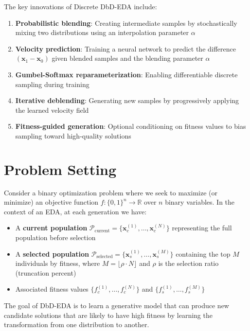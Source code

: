\documentclass[11pt,a4paper]{article}
\newcommand{\R}{\mathbb{R}}
\newcommand{\vx}{\mathbf{x}}
\begin{document}
The key innovations of Discrete DbD-EDA include:
\begin{enumerate}
    \item \textbf{Probabilistic blending}: Creating intermediate samples by stochastically mixing two distributions using an interpolation parameter $\alpha$
    \item \textbf{Velocity prediction}: Training a neural network to predict the difference $(\vx_1 - \vx_0)$ given blended samples and the blending parameter $\alpha$
    \item \textbf{Gumbel-Softmax reparameterization}: Enabling differentiable discrete sampling during training
    \item \textbf{Iterative deblending}: Generating new samples by progressively applying the learned velocity field
    \item \textbf{Fitness-guided generation}: Optional conditioning on fitness values to bias sampling toward high-quality solutions
\end{enumerate}

\section{Problem Setting}

Consider a binary optimization problem where we seek to maximize (or minimize) an objective function $f: \{0,1\}^n \rightarrow \R$ over $n$ binary variables. In the context of an EDA, at each generation we have:

\begin{itemize}
    \item A \textbf{current population} $\mathcal{P}_{\text{current}} = \{\vx^{(1)}_c, \ldots, \vx^{(N)}_c\}$ representing the full population before selection
    \item A \textbf{selected population} $\mathcal{P}_{\text{selected}} = \{\vx^{(1)}_s, \ldots, \vx^{(M)}_s\}$ containing the top $M$ individuals by fitness, where $M = \lfloor \rho \cdot N \rfloor$ and $\rho$ is the selection ratio (truncation percent)
    \item Associated fitness values $\{f^{(1)}_c, \ldots, f^{(N)}_c\}$ and $\{f^{(1)}_s, \ldots, f^{(M)}_s\}$
\end{itemize}

The goal of DbD-EDA is to learn a generative model that can produce new candidate solutions that are likely to have high fitness by learning the transformation from one distribution to another.
\end{document}
